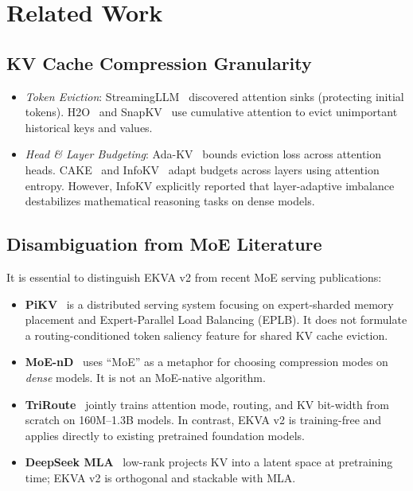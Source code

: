 \documentclass[runningheads]{llncs}
\begin{document}
\section{Related Work}

\subsection{KV Cache Compression Granularity}
\begin{itemize}
    \item \emph{Token Eviction}: StreamingLLM~\cite{xiao2023streamingllm} discovered attention sinks (protecting initial tokens). H2O~\cite{zhang2023h2o} and SnapKV~\cite{li2024snapkv} use cumulative attention to evict unimportant historical keys and values.
    \item \emph{Head \& Layer Budgeting}: Ada-KV~\cite{feng2025adakv} bounds eviction loss across attention heads. CAKE~\cite{cake2025} and InfoKV~\cite{lin2026infokv} adapt budgets across layers using attention entropy. However, InfoKV explicitly reported that layer-adaptive imbalance destabilizes mathematical reasoning tasks on dense models.
\end{itemize}

\subsection{Disambiguation from MoE Literature}
It is essential to distinguish EKVA v2 from recent MoE serving publications:
\begin{itemize}
    \item \textbf{PiKV}~\cite{liu2025pikv} is a distributed serving system focusing on expert-sharded memory placement and Expert-Parallel Load Balancing (EPLB). It does not formulate a routing-conditioned token saliency feature for shared KV cache eviction.
    \item \textbf{MoE-nD}~\cite{sun2026moend} uses ``MoE'' as a metaphor for choosing compression modes on \emph{dense} models. It is not an MoE-native algorithm.
    \item \textbf{TriRoute}~\cite{balashov2026triroute} jointly trains attention mode, routing, and KV bit-width from scratch on 160M--1.3B models. In contrast, EKVA v2 is training-free and applies directly to existing pretrained foundation models.
    \item \textbf{DeepSeek MLA}~\cite{dai2024deepseekmoe} low-rank projects KV into a latent space at pretraining time; EKVA v2 is orthogonal and stackable with MLA.
\end{itemize}
\end{document}
